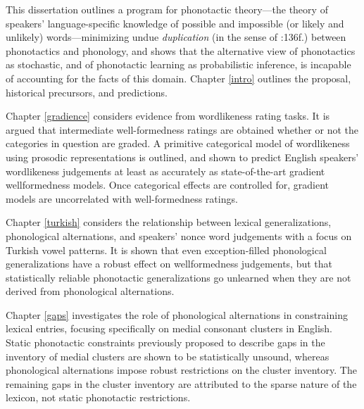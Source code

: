 This dissertation outlines a program for phonotactic theory---the theory of speakers' language-specific knowledge of possible and impossible (or likely and unlikely) words---minimizing undue \emph{duplication} (in the sense of :136f.) between phonotactics and phonology, and shows that the alternative view of phonotactics as stochastic, and of phonotactic learning as probabilistic inference, is incapable of accounting for the facts of this domain.
Chapter \ref{intro} outlines the proposal, historical precursors, and predictions. 

Chapter \ref{gradience} considers evidence from wordlikeness rating tasks. It is argued that intermediate well-formedness ratings are obtained whether or not the categories in question are graded. A primitive categorical model of wordlikeness using prosodic representations is outlined, and shown to predict English speakers' wordlikeness judgements at least as accurately as state-of-the-art gradient wellformedness models. Once categorical effects are controlled for, gradient models are uncorrelated with well-formedness ratings.

Chapter \ref{turkish} considers the relationship between lexical generalizations, phonological alternations, and speakers' nonce word judgements with a focus on Turkish vowel patterns. It is shown that even exception-filled phonological generalizations have a robust effect on wellformedness judgements, but that statistically reliable phonotactic generalizations go unlearned when they are not derived from phonological alternations.

Chapter \ref{gaps} investigates the role of phonological alternations in constraining lexical entries, focusing specifically on medial consonant clusters in English. Static phonotactic constraints previously proposed to describe gaps in the inventory of medial clusters are shown to be statistically unsound, whereas phonological alternations impose robust restrictions on the cluster inventory. The remaining gaps in the cluster inventory are attributed to the sparse nature of the lexicon, not static phonotactic restrictions.
